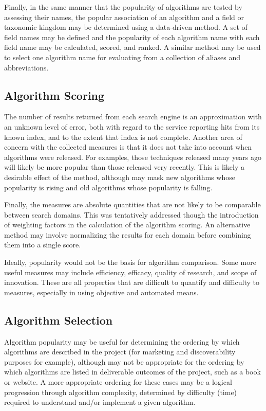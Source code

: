 \documentclass[a4paper, 11pt]{article}
\begin{document}
Finally, in the same manner that the popularity of algorithms are tested by assessing their names, the popular association of an algorithm and a field or taxonomic kingdom may be determined using a data-driven method. A set of field names may be defined and the popularity of each algorithm name with each field name may be calculated, scored, and ranked. A similar method may be used to select one algorithm name for evaluating from a collection of aliases and abbreviations.

\subsection{Algorithm Scoring}
The number of results returned from each search engine is an approximation with an unknown level of error, both with regard to the service reporting hits from its known index, and to the extent that index is not complete. Another area of concern with the collected measures is that it does not take into account when algorithms were released. For examples, those techniques released many years ago will likely be more popular than those released very recently. This is likely a desirable effect of the method, although may mask new algorithms whose popularity is rising and old algorithms whose popularity is falling. 

Finally, the measures are absolute quantities that are not likely to be comparable between search domains. This was tentatively addressed though the introduction of weighting factors in the calculation of the algorithm scoring. An alternative method may involve normalizing the results for each domain before combining them into a single score.

Ideally, popularity would not be the basis for algorithm comparison. Some more useful measures may include efficiency, efficacy, quality of research, and scope of innovation. These are all properties that are difficult to quantify and difficulty to measures, especially in using objective and automated means.  

\subsection{Algorithm Selection}
Algorithm popularity may be useful for determining the ordering by which algorithms are described in the project (for marketing and discoverability purposes for example), although may not be appropriate for the ordering by which algorithms are listed in deliverable outcomes of the project, such as a book or website. A more appropriate ordering for these cases may be a logical progression through algorithm complexity, determined by difficulty (time) required to understand and/or implement a given algorithm.  
\end{document}

